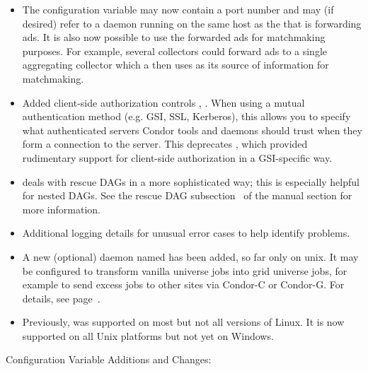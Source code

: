 \begin{itemize}
\item The configuration variable  may now
  contain a port number and may (if desired) refer to a
   daemon running on the same host as the
   that is forwarding ads.  It is also now possible to
  use the forwarded ads for matchmaking purposes.  For example, several
  collectors could forward ads to a single aggregating collector which
  a  then uses as its source of information for
  matchmaking.

\item Added client-side authorization controls
, .  When using a mutual
authentication method (e.g. GSI, SSL, Kerberos), this allows you to
specify what authenticated servers Condor tools and daemons should
trust when they form a connection to the server.  This deprecates
, which provided rudimentary support for
client-side authorization in a GSI-specific way.

\item {} deals with rescue DAGs in a more sophisticated
way; this is especially helpful for nested DAGs.
See the rescue DAG subsection~\pageref{sec:DAGRescue} of the 
manual section for more information.

\item Additional logging details for unusual error cases to help 
identify problems.

\item A new (optional) daemon named  has been
added, so far only on unix.  It may be configured to transform vanilla
universe jobs into grid universe jobs, for example to send excess jobs
to other sites via Condor-C or Condor-G.  For details, see
page~\pageref{sec:JobRouter}.

\item Previously,   was supported on most
but not all versions of Linux.  It is now supported on all Unix platforms
but not yet on Windows.

\end{itemize}

\noindent Configuration Variable Additions and Changes:

